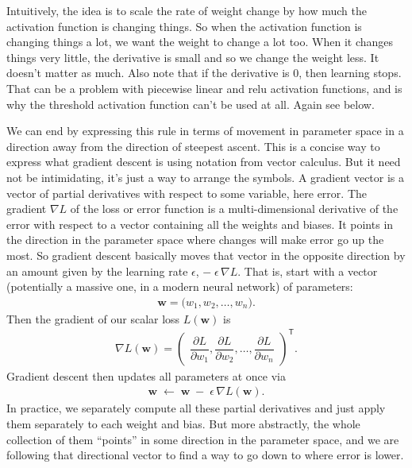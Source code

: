 Intuitively, the idea is to scale the rate of weight change by how much the activation function is changing things. So when the activation function is changing things a lot, we want the weight to change a lot too. When it changes things very little, the derivative is small and so we change the weight less. It doesn't matter as much. Also note that if the derivative is 0, then learning stops. That can be a problem with piecewise linear and relu activation functions, and is why the threshold activation function can't be used at all. Again see below.

We can end by expressing this rule in terms of movement in parameter space in a direction away from the direction of steepest ascent.  This is a concise way to express what gradient descent is using notation from vector calculus. But it need not be intimidating, it's just a way to arrange the symbols. A gradient vector is  a vector of partial derivatives with respect to some variable, here error.  The gradient $\nabla L$ of the loss or error function is a multi-dimensional derivative of the error with respect to a vector containing all the weights and biases. It points in the direction in the parameter space where changes will make error go up the most.  So gradient descent basically moves that vector in the opposite direction by an amount given by the learning rate $\epsilon$,  $-\;\epsilon\,\nabla L$. That is, start with a vector (potentially a massive one, in a modern neural network) of parameters:
\begin{eqnarray*}
  \mathbf{w} = \bigl(w_1, w_2, \dots, w_n\bigr).
\end{eqnarray*}
Then the gradient of our scalar loss \(L(\mathbf{w})\) is
\begin{eqnarray*}
  \nabla L(\mathbf{w})
    = \begin{pmatrix}
        \dfrac{\partial L}{\partial w_1}, 
        \dfrac{\partial L}{\partial w_2}, 
        \dots, 
        \dfrac{\partial L}{\partial w_n}
      \end{pmatrix}^\mathsf{T}.
\end{eqnarray*}
Gradient descent then updates all parameters at once via
\begin{eqnarray*}
  \mathbf{w} \;\leftarrow\; \mathbf{w} \;-\;\epsilon\,\nabla L(\mathbf{w}).
\end{eqnarray*}
In practice, we separately compute all these partial derivatives and just apply them separately to each weight and bias. But more abstractly, the whole collection of them ``points'' in some direction in the parameter space, and we are following that directional vector to find a way to go down to where error is lower.

